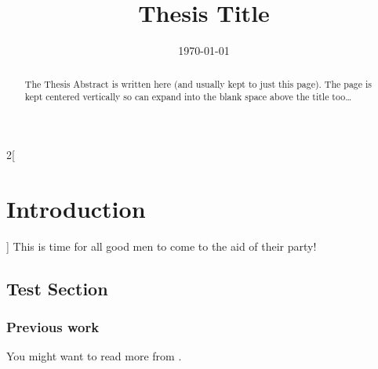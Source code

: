 \documentclass[a4paper, 11pt, oneside]{article/HSR}  %
\begin{document}
  \title  {Thesis Title}
  \addresses {\groupname\\\deptname\\\univname}  %
  \date      {\today}
  \subject   {}
  \keywords  {}

  \pagestyle{fancy}

  \maketitle


  \begin{abstract}
    The Thesis Abstract is written here (and usually kept to just this page). The page is kept centered vertically so can expand into the blank space above the title too\ldots
  \end{abstract}

  \clearpage

  \tableofcontentspage









  \begin{multicols}{2}[\section{Introduction}]
    \label{introduction}
    This is time for all good men to come to the aid of their party!

    \subsection{Test Section}\label{test section}
    \Blindtext
    \Blindtext
    \Blindtext

    \subsubsection{Previous work}\label{previous work}
    You might want to read more from \citet{einstein}.
    \vfill\null
    \clearpage
  \end{multicols}
\end{document}
